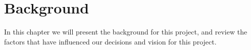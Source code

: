 \section{Background}
In this chapter we will present the background for this project, and review the factors that have
influenced our decisions and vision for this project.